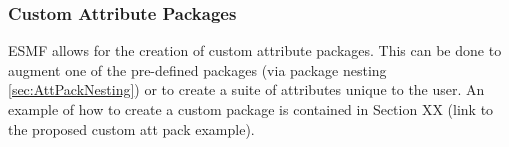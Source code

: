 \vspace{.20in}




\subsubsection{Custom Attribute Packages}
\label{sec:CustomAttPacks}

ESMF allows for the creation of custom attribute packages. This can be done to augment one of the pre-defined packages (via package nesting \ref{sec:AttPackNesting}) or to create a suite of 
attributes unique to the user. An example of how to create a custom package is contained in Section XX (link to the proposed custom att pack example).
